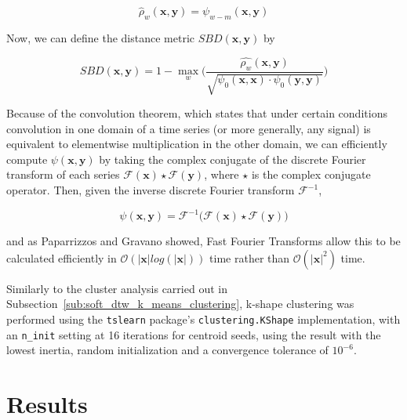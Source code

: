 \documentclass{article}
\begin{document}
\begin{equation}
	\hat{\rho}_w (\mathbf{x}, \mathbf{y}) = \psi_{w - m} (\mathbf{x}, \mathbf{y})
\end{equation}

\noindent Now, we can define the distance metric $SBD(\mathbf{x}, \mathbf{y})$ by

\begin{equation}
	SBD(\mathbf{x}, \mathbf{y}) = 1 - \max_w \Bigg( \frac{\hat{\rho_w} (\mathbf{x}, \mathbf{y})}{\sqrt{\psi_0(\mathbf{x}, \mathbf{x}) \cdot \psi_0(\mathbf{y}, \mathbf{y})}} \Bigg)
\end{equation}

Because of the convolution theorem, which states that under certain conditions convolution in one domain of a time series (or more generally, any signal) is equivalent to elementwise multiplication in the other domain,\cite{oppenheim2001discrete} we can efficiently compute $\psi(\mathbf{x}, \mathbf{y})$ by taking the complex conjugate of the discrete Fourier transform of each series $\mathcal{F}(\mathbf{x}) \star \mathcal{F}(\mathbf{y})$, where $\star$ is the complex conjugate operator.\cite{paparrizos2015k} Then, given the inverse discrete Fourier transform $\mathcal{F}^{-1}$,

\begin{equation}
	\psi(\mathbf{x}, \mathbf{y}) = \mathcal{F}^{-1} \Big( \mathcal{F}(\mathbf{x}) \star \mathcal{F}(\mathbf{y}) \Big)
\end{equation}

\noindent and as Paparrizzos and Gravano showed,\cite{paparrizos2015k} Fast Fourier Transforms allow this to be calculated efficiently in $\mathcal{O}(|\mathbf{x}| log(|\mathbf{x}|))$ time rather than $\mathcal{O}(|\mathbf{x}|^2)$ time.

Similarly to the cluster analysis carried out in Subsection~\ref{sub:soft_dtw_k_means_clustering}, k-shape clustering was performed using the \texttt{tslearn} package's \texttt{clustering.KShape} implementation, with an \texttt{n\_init} setting at 16 iterations for centroid seeds, using the result with the lowest inertia, random initialization and a convergence tolerance of $10^{-6}$.



\section{Results} %
\label{sec:results}
\end{document}
